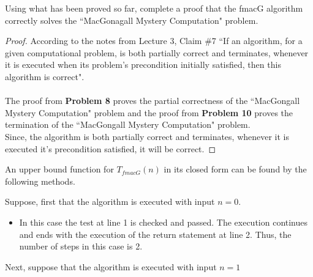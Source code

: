 \documentclass[12pt]{article}
\newenvironment{problem}[2][Problem]{\begin{trivlist}
\item[\hskip \labelsep {\bfseries #1}\hskip \labelsep {\bfseries #2.}]}{\end{trivlist}}
\begin{document}

\begin{problem}{11}
Using what has been proved so far, complete a proof that the fmacG algorithm correctly
solves the “MacGonagall Mystery Computation" problem.

\end{problem}

\begin{proof}
According to the notes from Lecture 3, Claim \#7 ``If an algorithm, for a given computational problem, is
both partially correct and terminates, whenever it is executed when its problem’s precondition initially satisfied, then this algorithm is correct".
\\ 
\\
The proof from \textbf{Problem 8} proves the partial correctness of the ``MacGongall Mystery Computation" problem and the proof from \textbf{Problem 10} proves the termination of the ``MacGongall Mystery Computation" problem.
\\
Since, the algorithm is both partially correct and terminates, whenever it is executed it's precondition satisfied, it will be correct. 

\end{proof}



\begin{problem}{12}
    An upper bound function for $T_{fmacG}(n)$ in its closed form can be found by the following 
    methods. 
\end{problem}

\noindent Suppose, first that the algorithm is executed with input $n=0$. \\

\begin{itemize}
    \item In this case the test at line 1 is checked and passed. The execution continues and ends with the
    execution of the return statement at line 2. Thus, the number of steps in this case is 2. 
\end{itemize}


\noindent Next, suppose that the algorithm is executed with input $n=1$\\
\end{document}
